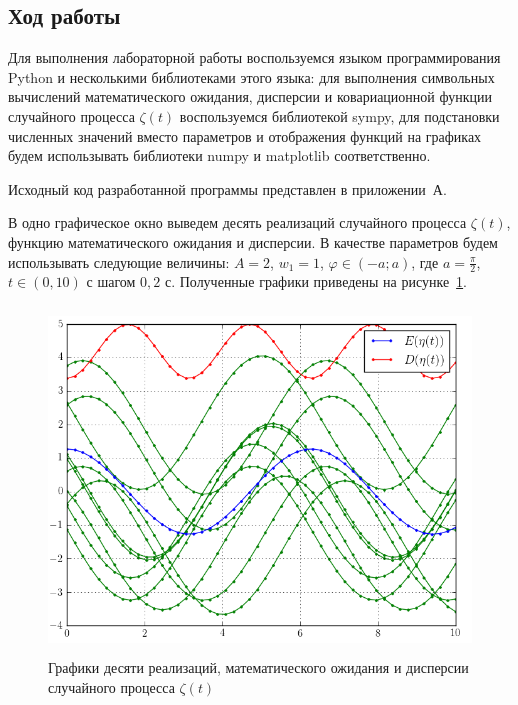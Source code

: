 \pagebreak
\subsection{Ход работы}

Для выполнения лабораторной работы воспользуемся языком программирования
Python и несколькими библиотеками этого языка:
для выполнения символьных вычислений математического ожидания, дисперсии и
ковариационной функции случайного процесса $ \zeta(t) $ воспользуемся библиотекой
sympy, для подстановки численных значений вместо параметров и отображения функций
на графиках будем использывать библиотеки numpy и matplotlib соответственно.

Исходный код разработанной программы представлен в приложении~А.


В одно графическое окно выведем десять реализаций случайного процесса $ \zeta(t) $,
функцию математического ожидания и дисперсии. В качестве параметров будем использывать
следующие величины: $ A = 2 $, $ w_1 = 1 $, $ \varphi \in (-a; a) $, где $ a = \frac{\pi}{2} $,
$ t \in (0, 10) $ с шагом $ 0{,}2 $ с. Полученные графики приведены на рисунке~\ref{pic:values}.
\begin{figure}[h]
  \centering
  \includegraphics[width=150mm, height=92mm]{pic/values}
  \caption{Графики десяти реализаций, математического ожидания и дисперсии случайного процесса $ \zeta(t) $}
  \label{pic:values} 
\end{figure}

\pagebreak

